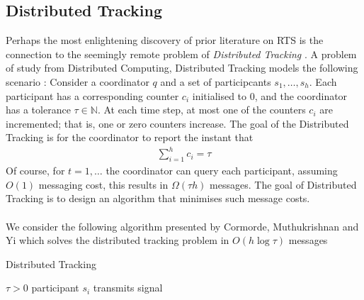 
\subsection{Distributed Tracking}

Perhaps the most enlightening discovery of prior literature on RTS is the connection to the seemingly remote problem of \textit{Distributed Tracking} \cite{Gan}. A problem of study from Distributed Computing, Distributed Tracking models the following scenario \cite{Cormode}: Consider a coordinator $q$ and a set of participcants $s_1, \dots, s_h$. Each participant has a corresponding counter $c_i$ initialised to 0, and the coordinator has a tolerance $\tau\in\mathbb{N}$. At each time step, at most one of the counters $c_i$ are incremented; that is, one or zero counters increase.  The goal of the Distributed Tracking is for the coordinator to report the instant that 
\begin{align}
    \sum_{i=1}^{h}c_i = \tau
\end{align}
Of course, for $t=1,\dots$ the coordinator can query each participant, assuming $O(1)$ messaging cost, this results in  $\Omega(\tau h)$ messages. The goal of Distributed Tracking is to design an algorithm that minimises such message costs. \\
\\
We consider the following algorithm presented by Cormorde, Muthukrishnan and Yi \cite{Cormode} which solves the distributed tracking problem in $O(h\log \tau)$ messages

\begin{algorithm}
\caption{Distributed Tracking }\label{Algorithm 1}
\begin{algorithmic}
\Require $\tau > 0$
    \State {}
    \State {} 
    \State {}
     
            \State participant $s_i$ transmits signal
        \EndIf
    \EndFor
\EndIf
\end{algorithmic}
\end{algorithm}


